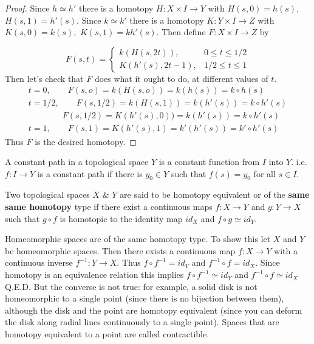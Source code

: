 \begin{proof}
Since $h\simeq h'$ there is a homotopy $H:X\times I \rightarrow Y$ with $H(s,0)=h(s),$ $H(s,1)=h'(s).$
Since $k\simeq k'$ there is a homotopy $K:Y\times I \rightarrow Z$ with $K(s,0)=k(s),$ $K(s,1)=kh'(s).$ Then define $F: X\times I\rightarrow Z$ by

$$
F(s,t)=
\begin{cases}
k(H(s,2t)),&0\leq t\leq 1/2\\
K(h'(s),2t-1),&1/2\leq t\leq 1
\end{cases}
$$
Then let's check that $F$ does what it ought to do, at different values of $t$.\\
\begin{align*}
t=0,\qquad F(s,o)=k(H(s,o))=k(h(s))=k\circ h(s)\\
t=1/2,\qquad F(s,1/2)=k(H(s,1))=k(h'(s))=k\circ h'(s)\\
\qquad \qquad F(s,1/2)=K(h'(s),0))=k(h'(s))=k\circ h'(s)\\
t=1,\qquad F(s,1)=K(h'(s),1)=k'(h'(s))=k'\circ h'(s)
\end{align*}
Thus $F$ is the desired homotopy.
\end{proof}


\begin{definition}
A constant path in a topological space $Y$ is a constant function from $I$ into $Y$. i.e. $f:I\rightarrow Y$ is a constant path if there is $y_0\in Y$ such that $f(s)=y_0$ for all $s\in I$.
\end{definition}

\begin{definition}
Two topological spaces $X$ $\&$ $Y$ are said to be homotopy equivalent or of the \textbf{same same homotopy} type if there exist a continuous maps $f:X\rightarrow Y$ and $g:Y\rightarrow X$ such that $g\circ f $ is homotopic to the identity map $id_X$ and $f\circ g\simeq id_Y$.
\end{definition}




Homeomorphic spaces are of the same homotopy type. To show this let $X$ and $Y$ be homeomorphic spaces. Then there exists a continuous map $f:X\rightarrow Y$ with a continuous inverse $f^{-1}:Y\rightarrow X$. Thus $f\circ f^{-1}=id_Y$ and $f^{-1}\circ f=id_X$. Since homotopy is an equivalence relation this implies $f\circ f^{-1}\simeq id_Y$ and $f^{-1}\circ f\simeq id_X$  Q.E.D. But the converse is not true: for example, a solid disk is not homeomorphic to a single point (since there is no bijection between them), although the disk and the point are homotopy equivalent (since you can deform the disk along radial lines continuously to a single point). Spaces that are homotopy equivalent to a point are called contractible.

